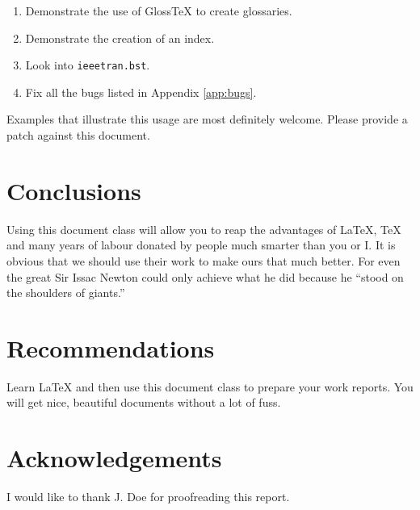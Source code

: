 \documentclass{uw-wkrpt}
\begin{document}
\begin{enumerate}
  \item Demonstrate the use of Gloss\TeX{} to create glossaries.
  \item Demonstrate the creation of an index.
  \item Look into \texttt{ieeetran.bst}.
  \item Fix all the bugs listed in Appendix \ref{app:bugs}.
\end{enumerate}

Examples that illustrate this usage are most definitely welcome.  Please
provide a patch against this document.

\section{Conclusions}
Using this document class will allow you to reap the advantages of
\LaTeX{}, \TeX{} and many years of labour donated by people much 
smarter than you or I.  It is obvious that we should use their work
to make ours that much better.  For even the great Sir Issac Newton
could only achieve what he did because he ``stood on the shoulders
of giants.''

\section{Recommendations}
Learn \LaTeX{} and then use this document class to prepare your
work reports.  You will get nice, beautiful documents without a lot
of fuss.

\backmatter


\printbibliography[heading=bibintoc]

\section*{Acknowledgements}
{}
I would like to thank J. Doe for proofreading this report.
\end{document}
